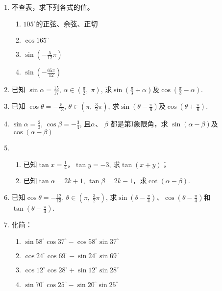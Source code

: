 \begin{enumerate}
    \item 不查表，求下列各式的值。
\begin{multicols}{2}
\begin{enumerate}[(1)]
    \item $105^{\circ}$的正弦、余弦、正切
    \item  $\cos 165^{\circ }$
    \item $\sin \left ( - \frac 5{12}\pi \right ) $
    \item $\sin \left ( - \frac {65\pi }{12}\right ) $
\end{enumerate}    
\end{multicols}
\item 已知 $\sin\alpha = \frac {15}{17}$, $\alpha \in \left ( \frac \pi 2, \;\pi \right )$, 
    求$\sin\left(\frac\pi{3}+\alpha\right)$及$\cos\left(\frac\pi3-\alpha\right)$.
\item    已知 $\cos \theta = - \frac 5{13}$, $\theta \in \left (\pi , \; \frac {3}{2}\pi \right )$, 
    求$\sin\left(\theta-\frac\pi6\right)$及$\cos\left(\theta+\frac\pi6\right)$.
\item $\sin \alpha = \frac 23$, $\cos \beta = - \frac 34$, 且$\alpha$、 $\beta$ 都是第I象限角，求 $\sin(\alpha-\beta)$及$\cos(\alpha-\beta)$
\item \begin{enumerate}[(1)]
\item 已知$\tan x=\frac{1}{4}$，$\tan y=-3$, 求$\tan(x+y)$；
\item 已知$\tan \alpha = 2k+ 1$, $\tan\beta=2k-1$，求$\cot(\alpha-\beta)$.
\end{enumerate}

\item 已知$\cos \theta = - \frac {12}{13}$, $\theta \in \left(\pi,\; \frac{3}{2}\pi\right)$, 求$\sin\left(\theta-\frac{\pi}{4}\right)$、$\cos\left(\theta-\frac{\pi}{4}\right)$和$\tan\left(\theta-\frac{\pi}{4}\right)$.
\item 化简：
\begin{multicols}{2}
\begin{enumerate}[(1)]
    \item $\sin58^{\circ}\cos37^{\circ}-\cos 58^{\circ}\sin37^{\circ}$
    \item $\cos24^{\circ}\cos69^{\circ}-\sin24^{\circ}\sin69^{\circ}$
    \item $\cos12^{\circ}\cos28^{\circ}+\sin12^{\circ}\sin28^{\circ}$
    \item $\sin70^{\circ}\cos25^{\circ}-\sin20^{\circ}\sin25^{\circ}$
\end{enumerate}    
\end{multicols}

\end{enumerate}

